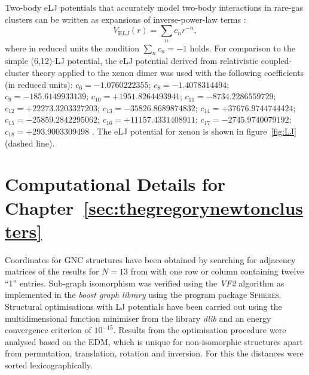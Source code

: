 Two-body \ac{eLJ} potentials that accurately model
two-body interactions in rare-gas clusters can be written as expansions of
inverse-power-law terms
\autocite{Schwerdtfeger_ExtensionLennardJonespotential_2006}:
%
\begin{equation} \label{eq:ELJ}
V_{\mathrm ELJ}(r)=\sum_{n} c_nr^{-n},
\end{equation}
%
where in reduced units the condition $\sum_{n} c_n=-1$ holds. For comparison
to the simple (6,12)-\ac{LJ} potential, the \ac{eLJ} potential derived from
relativistic coupled-cluster theory applied to the xenon dimer was used with the
following coefficients (in reduced units):
$c_6=-1.0760222355$; $c_8=-1.4078314494$; $c_9=-185.6149933139$;
$c_{10}=+1951.8264493941$; $c_{11}=-8734.2286559729$;
$c_{12}=+22273.3203327203$; $c_{13}=-35826.8689874832$;
$c_{14}=+37676.9744744424$; $c_{15}=-25859.2842295062$;
$c_{16}=+11157.4331408911$; $c_{17}=-2745.9740079192$; $c_{18}=+293.9003309498$
\autocite{Jerabek_relativisticcoupledclusterinteraction_2017}. The \ac{eLJ}
potential for xenon is shown in figure~\ref{fig:LJ} (dashed line).

\section{Computational Details for Chapter~\ref{sec:thegregorynewtonclusters}}

Coordinates for \ac{GNC} structures have been obtained by searching for
adjacency matrices of the results for $N=13$ from
\citeauthor{Holmes-Cerfon_EnumeratingRigidSphere_2016}
\autocite{Holmes-Cerfon_EnumeratingRigidSphere_2016} with one row or column
containing twelve ``1'' entries. Sub-graph isomorphism was verified using the
\textit{VF2} algorithm \autocite{Cordella_SubGraphIsomorphism_2004} as
implemented in the \textit{boost graph library}
\autocite{Siek_BoostGraphLibrary_2002} using the program package
\textsc{Spheres}. Structural optimisations with \ac{LJ} potentials have been carried
out using the multidimensional function minimiser from the \Cpp library
\textit{dlib} \autocite{King_DlibmlMachineLearning_2009} and an energy
convergence criterion of $10^{-15}$. Results from the optimisation procedure
were analysed based on the \ac{EDM}, which is unique for
non-isomorphic structures apart from permutation, translation, rotation and
inversion. For this the distances were sorted lexicographically.
